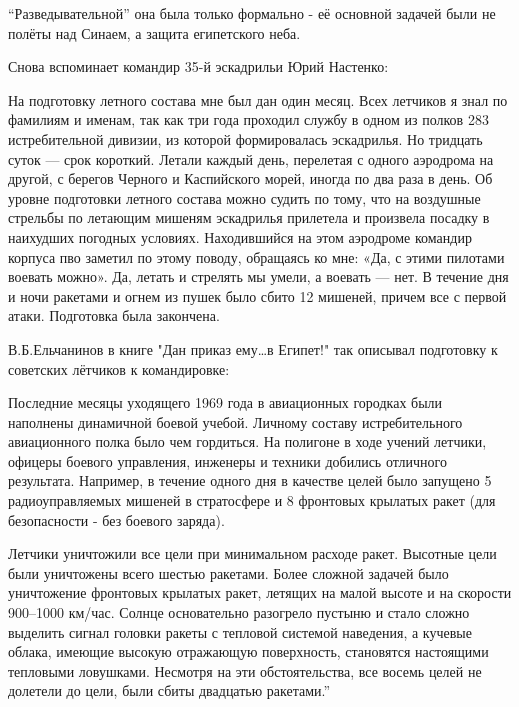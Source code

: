 “Разведывательной” она была только формально - её основной задачей были не полёты над Синаем, а защита египетского неба.

Снова вспоминает командир 35-й эскадрильи Юрий Настенко:

\begin{textcitation}
	На подготовку летного состава мне был дан один месяц. Всех летчиков я знал по фамилиям и именам, так как три года проходил службу в одном из полков 283 истребительной дивизии, из которой формировалась эскадрилья. Но тридцать суток — срок короткий. Летали каждый день, перелетая с одного аэродрома на другой, с берегов Черного и Каспийского морей, иногда по два раза в день. Об уровне подготовки летного состава можно судить по тому, что на воздушные стрельбы по летающим мишеням эскадрилья прилетела и произвела посадку в наихудших погодных условиях. Находившийся на этом аэродроме командир корпуса пво заметил по этому поводу, обращаясь ко мне: «Да, с этими пилотами воевать можно». Да, летать и стрелять мы умели, а воевать — нет. В течение дня и ночи ракетами и огнем из пушек было сбито 12 мишеней, причем все с первой атаки. Подготовка была закончена.
\end{textcitation}

В.Б.Ельчанинов в книге "Дан приказ ему…в Египет!" так описывал подготовку к советских лётчиков к командировке:

\begin{textcitation}
	Последние месяцы уходящего 1969 года в авиационных городках были наполнены динамичной боевой учебой. Личному составу истребительного авиационного полка было чем гордиться. На полигоне в ходе учений летчики, офицеры боевого управления, инженеры и техники добились отличного результата. Например, в течение одного дня в качестве целей было запущено 5 радиоуправляемых мишеней в стратосфере и 8 фронтовых крылатых ракет (для безопасности - без боевого заряда).
\end{textcitation}

Летчики уничтожили все цели при минимальном расходе ракет. Высотные цели были уничтожены всего шестью ракетами. Более сложной задачей было уничтожение фронтовых крылатых ракет, летящих на малой высоте и на скорости 900–1000 км/час. Солнце основательно разогрело пустыню и стало сложно выделить сигнал головки ракеты с тепловой системой наведения, а кучевые облака, имеющие высокую отражающую поверхность, становятся настоящими тепловыми ловушками. Несмотря на эти обстоятельства, все восемь целей не долетели до цели, были сбиты двадцатью ракетами.”

